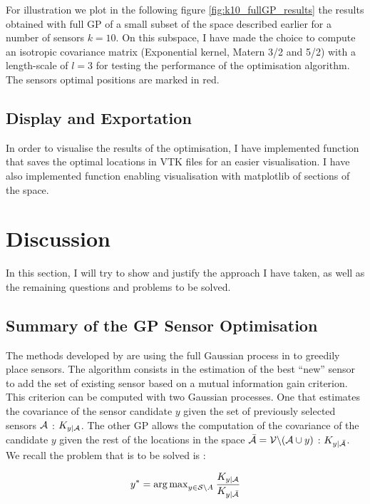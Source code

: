 For illustration we plot in the following figure \ref{fig:k10_fullGP_results} the results obtained with full GP of a small subset of the space described earlier for a number of sensors $k=10$.  On this subspace, I have made the choice to compute an isotropic covariance matrix (Exponential kernel,  Matern 3/2 and 5/2) with a length-scale of $l=3$ for testing the performance of the optimisation algorithm. The sensors optimal positions are marked in red.  



\subsection{Display and Exportation}

In order to visualise the results of the optimisation, I have implemented function that saves the optimal locations in VTK files for an easier visualisation. I have also implemented function enabling visualisation with matplotlib of sections of the space. 

\section{Discussion}

In this section, I will try to show and justify the approach I have taken, as well as the remaining questions and problems to be solved. 

\subsection{Summary of the GP Sensor Optimisation}

The methods developed by \citet{krause_near-optimal_2008} are using the full Gaussian process in to greedily place sensors. The algorithm consists in the estimation of the best “new” sensor to add the set of existing sensor based on a mutual information gain criterion. This criterion can be computed with two Gaussian processes. One that estimates the covariance of the sensor candidate $y$ given the set of previously selected sensors $\mathcal{A}$ : $K_{y | \mathcal{A}}$. The other GP allows the computation of the covariance of the candidate $y$ given the rest of the locations in the space $\bar{\mathcal{A}} = \mathcal{V} \backslash ( \mathcal{A} \cup y )$ : $K_{y | \bar{\mathcal{A}}}$. We recall the problem that is to be solved is :

\begin{equation}
    y^* = {\arg \max}_{y \in \mathcal{S} \backslash A } \: \frac{K_{y | \mathcal{A}}}{K_{y | \bar{\mathcal{A}}}}
\end{equation}

